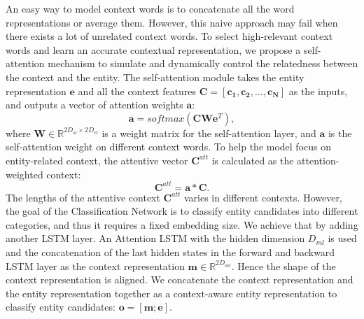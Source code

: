 \documentclass[11pt,a4paper]{article}
\begin{document}
An easy way to model context words is to concatenate all the word representations or average them. However, this naive approach may fail when there exists a lot of unrelated context words. To select high-relevant context words and learn an accurate contextual representation, we propose a self-attention mechanism to simulate and dynamically control the relatedness between the context and the entity.
The self-attention module takes the entity representation $\mathbf{e}$ and all the context features $\mathbf{C} =  [\mathbf{c_{1}}, \mathbf{c_{2}}, ...,  \mathbf{c_{N}}]$ as the inputs, and outputs a vector of attention weights $\mathbf{a}$:
\begin{equation}
    \mathbf{a} = softmax( \mathbf{C} \mathbf{W} \mathbf{e}^T),
\end{equation}
where $\mathbf{W} \in \mathbb{R}^{2D_{sl} \times 2D_{el}}$ is a weight matrix for the self-attention layer, and $\mathbf{a}$ is the self-attention weight on different context words. To help the model focus on entity-related context, the attentive vector $\mathbf{C}^{att}$ is calculated as the attention-weighted context:
\begin{equation}
\mathbf{C}^{att} = \mathbf{a} * \mathbf{C}.
\end{equation}
The lengths of the attentive context $\mathbf{C}^{att}$ varies in different contexts. However, the goal of the Classification Network is to classify entity candidates into different categories, and thus it requires a fixed embedding size. We achieve that by adding another LSTM layer. An Attention LSTM with the hidden dimension $D_{ml}$ is used and the concatenation of the last hidden states in the forward and backward LSTM layer as the context representation $\mathbf{m} \in \mathbb{R}^{2D_{ml}}$. Hence the shape of the context representation is aligned.
We concatenate the context representation and the entity representation together as a context-aware entity representation to classify entity candidates: $ \mathbf{o} = [\mathbf{m}; \mathbf{e}]$.
\end{document}
